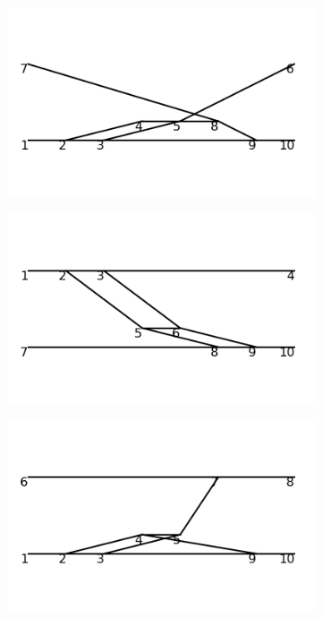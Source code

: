 \documentclass[11pt,a4paper,twoside,pdf]{article}
\numberwithin{equation}{section}
\begin{document}
\begin{figure}[h!]
\begin{subfigure}[t]{0.16\textwidth}
    \end{subfigure}
    \hfill
    \begin{subfigure}[t]{0.16\textwidth}
        \centering
        \includegraphics[width=\textwidth]{plots/order6_2to2/36.png}
    \end{subfigure}
    \hfill
    \begin{subfigure}[t]{0.16\textwidth}
        \centering
        \includegraphics[width=\textwidth]{plots/order6_2to2/37.png}
    \end{subfigure}
    \hfill
    \begin{subfigure}[t]{0.16\textwidth}
        \centering
        \includegraphics[width=\textwidth]{plots/order6_2to2/38.png}

\end{subfigure}
\end{figure}
\end{document}
